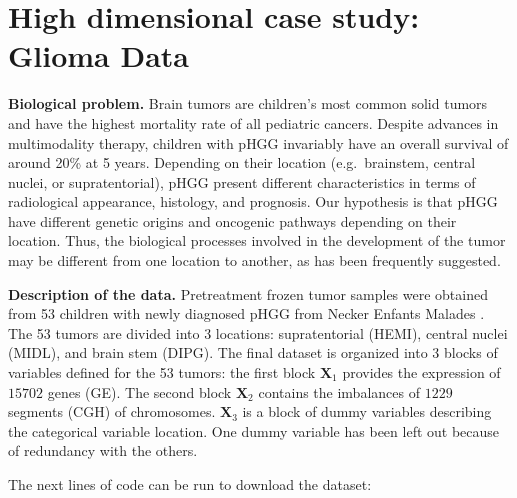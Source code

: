 \documentclass[
]{jss}
\begin{document}
\hypertarget{high-dimensional-case-study-glioma-data}{%
\section{High dimensional case study: Glioma
Data}\label{high-dimensional-case-study-glioma-data}}

\textbf{Biological problem.} Brain tumors are children's most common
solid tumors and have the highest mortality rate of all pediatric
cancers. Despite advances in multimodality therapy, children with pHGG
invariably have an overall survival of around 20\% at 5 years. Depending
on their location (e.g.~brainstem, central nuclei, or supratentorial),
pHGG present different characteristics in terms of radiological
appearance, histology, and prognosis. Our hypothesis is that pHGG have
different genetic origins and oncogenic pathways depending on their
location. Thus, the biological processes involved in the development of
the tumor may be different from one location to another, as has been
frequently suggested.

\textbf{Description of the data.} Pretreatment frozen tumor samples were
obtained from 53 children with newly diagnosed pHGG from Necker Enfants
Malades \citep[Paris, France, ][]{Puget2012}. The 53 tumors are divided
into 3 locations: supratentorial (HEMI), central nuclei (MIDL), and
brain stem (DIPG). The final dataset is organized into 3 blocks of
variables defined for the 53 tumors: the first block \(\mathbf{X}_1\)
provides the expression of \(15702\) genes (GE). The second block
\(\mathbf{X}_2\) contains the imbalances of \(1229\) segments (CGH) of
chromosomes. \(\mathbf{X}_3\) is a block of dummy variables describing
the categorical variable location. One dummy variable has been left out
because of redundancy with the others.

The next lines of code can be run to download the dataset:

\footnotesize

\begin{CodeChunk}
\end{CodeChunk}
\end{document}
